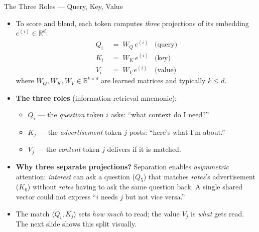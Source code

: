 \begin{frame}{The Three Roles --- Query, Key, Value}
\begin{itemize}
\item To score and blend, each token computes \emph{three} projections of its embedding $e^{(i)} \in \mathbb{R}^{d}$:
\begin{align*}
   Q_{i} &\;=\; W_{Q}\, e^{(i)} & \text{(query)}\\
   K_{i} &\;=\; W_{K}\, e^{(i)} & \text{(key)}\\
   V_{i} &\;=\; W_{V}\, e^{(i)} & \text{(value)}
\end{align*}
where $W_{Q}, W_{K}, W_{V} \in \mathbb{R}^{k \times d}$ are learned matrices and typically $k \le d$.

\medskip
\item \textbf{The three roles} (information-retrieval mnemonic):
\begin{itemize}
    \item $Q_i$ --- the \emph{question} token $i$ asks: ``what context do I need?''
    \item $K_j$ --- the \emph{advertisement} token $j$ posts: ``here's what I'm about.''
    \item $V_j$ --- the \emph{content} token $j$ delivers if it is matched.
\end{itemize}

\medskip
\item \textbf{Why three separate projections?} Separation enables \emph{asymmetric} attention: \emph{interest} can ask a question ($Q_5$) that matches \emph{rates}'s advertisement ($K_6$) without \emph{rates} having to ask the same question back. A single shared vector could not express ``$i$ needs $j$ but not vice versa.''

\medskip
\item The match $\langle Q_i, K_j\rangle$ sets \emph{how much} to read; the value $V_j$ is \emph{what} gets read. The next slide shows this split visually.
\end{itemize}
\end{frame}

